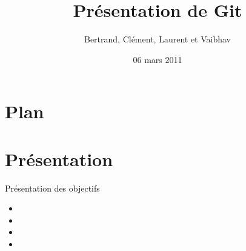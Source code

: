 \documentclass{beamer}
\title[ROSE]{Présentation de Git}
\author{Bertrand, Clément, Laurent et Vaibhav}
\institute{Télécom Paristech}
\date{06 mars 2011}
\begin{document}
\begin{frame}
  \titlepage
\end{frame}

\section*{Plan}
%

\section{Présentation}
\begin{frame}{Présentation des objectifs}
  \begin{itemize}
  \item 
  \item 
  \item 
  \item 
  \end{itemize}
\end{frame}
\end{document}
